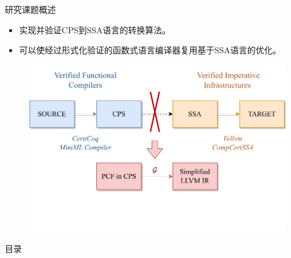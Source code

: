 \documentclass[xcolor=table,dvipsnames,svgnames,aspectratio=169]{ctexbeamer}
\begin{document}
\begin{frame}{研究课题概述}
  \begin{itemize}
    \item 实现并验证CPS到SSA语言的转换算法。
    \item 可以使经过形式化验证的函数式语言编译器复用基于SSA语言的优化。
  \end{itemize}
  \begin{figure}
    \centering
    \includegraphics[width=0.7\linewidth]{figures/partial.drawio.pdf}
    \label{fig:moti2}
  \end{figure}  
\end{frame}


\begin{frame}{目录}
  \tableofcontents[hideallsubsections]	%
\end{frame}



% 
% 
% 


\makebottom
\end{document}
